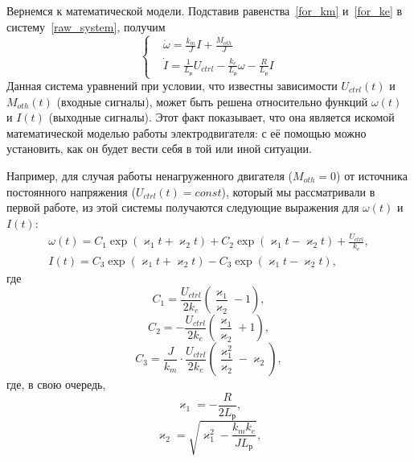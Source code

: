 \documentclass[12pt, a4paper, openany]{extarticle}
\begin{document}
Вернемся к математической модели.
Подставив равенства~\eqref{for_km} и~\eqref{for_ke} в систему~\eqref{raw_system}, получим
\begin{equation}\label{the_main_system}
	\left\{	
		\begin{aligned}
			&\dot{\omega} = \frac{k_m}{J}I + \frac{M_{oth}}{J}\\
			&\dot{I} =\frac{1}{L_\textit{р}}U_{ctrl} - \frac{k_e}{L_\textit{р}}\omega - \frac{R}{L_\textit{р}}I
		\end{aligned}
	\right.
\end{equation}
Данная система уравнений при условии, что известны зависимости $U_{ctrl}(t)$ и $M_{oth}(t)$ (входные сигналы), может быть решена относительно функций $\omega(t)$ и $I(t)$ (выходные сигналы). 
Этот факт показывает, что она является искомой математической моделью работы электродвигателя: с её помощью можно установить, как он будет вести себя в той или иной ситуации. 

Например, для случая работы ненагруженного двигателя ($M_{oth} = 0$) от источника постоянного напряжения ($U_{ctrl}(t) = const$), который мы  рассматривали в первой работе, из этой системы получаются следующие выражения для $\omega(t)$ и $I(t)$:
\begin{gather}\label{w(t)}
	\omega(t) = C_1\exp\left(\varkappa_1t + \varkappa_2t\right) +C_2\exp\left(\varkappa_1t-\varkappa_2 t\right)+\frac{U_{ctrl}}{k_e},\\
	I(t) = C_3\exp\left(\varkappa_1t + \varkappa_2t\right) - C_3\exp\left(\varkappa_1t - \varkappa_2t\right),\label{I(t)}
\end{gather}
где
\begin{equation}
	C_1 = \frac{U_{ctrl}}{2k_e}\left(\frac{\varkappa_1}{\varkappa_2} - 1\right),
\end{equation}
\begin{equation}
	C_2 = -\frac{U_{ctrl}}{2k_e}\left(\frac{\varkappa_1}{\varkappa_2} + 1\right),
\end{equation}
\begin{equation}
	C_3 = \frac{J}{k_m}\cdot\frac{U_{ctrl}}{2k_e}\left(\frac{\varkappa_1^2}{\varkappa_2} - \varkappa_2\right)\!\!,
\end{equation}
где, в свою очередь,
\begin{equation}
	\varkappa_1 = -\frac{R}{2L_\textit{р}},
\end{equation}
\begin{equation}
	\varkappa_2 = \sqrt{\varkappa_1^2 - \frac{k_mk_e}{JL_\textit{р}}},
\end{equation}
\end{document}
